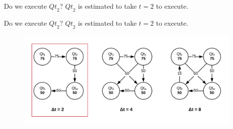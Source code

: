 \documentclass[10pt]{beamer}
\begin{document}
\begin{frame}[fragile]{Do we execute $\mathit{Qt}_2$?}
    $\mathit{Qt}_2$ is estimated to take $t=2$ to execute.
\end{frame}

\begin{frame}[fragile]{Do we execute $\mathit{Qt}_2$?}
    $\mathit{Qt}_2$ is estimated to take $t=2$ to execute.
    \begin{figure}
        \center
        \includegraphics[scale=0.17]{apollo_session_aware_caching_2}
    \end{figure}
\end{frame}
\end{document}
